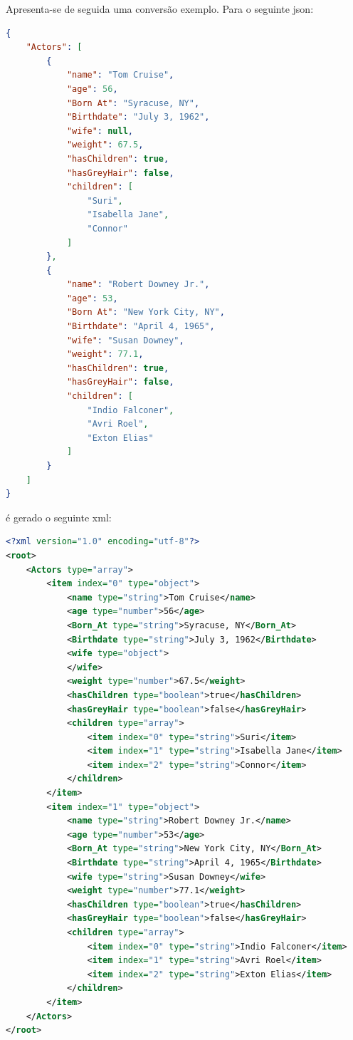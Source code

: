 Apresenta-se de seguida uma conversão exemplo. Para o seguinte \acrshort{json}:
\begin{lstlisting}[language=json, caption=\acrshort{json} exemplo a converter, label=exem:json]
{
    "Actors": [
        {
            "name": "Tom Cruise",
            "age": 56,
            "Born At": "Syracuse, NY",
            "Birthdate": "July 3, 1962",
            "wife": null,
            "weight": 67.5,
            "hasChildren": true,
            "hasGreyHair": false,
            "children": [
                "Suri",
                "Isabella Jane",
                "Connor"
            ]
        },
        {
            "name": "Robert Downey Jr.",
            "age": 53,
            "Born At": "New York City, NY",
            "Birthdate": "April 4, 1965",
            "wife": "Susan Downey",
            "weight": 77.1,
            "hasChildren": true,
            "hasGreyHair": false,
            "children": [
                "Indio Falconer",
                "Avri Roel",
                "Exton Elias"
            ]
        }
    ]
}
\end{lstlisting}

é gerado o seguinte \acrshort{xml}:
\begin{lstlisting}[language=xml, caption=\acrshort{xml} resultante da conversão do \acrshort{json} presente em~\ref{exem:json}]
<?xml version="1.0" encoding="utf-8"?>
<root>
    <Actors type="array">
        <item index="0" type="object">
            <name type="string">Tom Cruise</name>
            <age type="number">56</age>
            <Born_At type="string">Syracuse, NY</Born_At>
            <Birthdate type="string">July 3, 1962</Birthdate>
            <wife type="object">
            </wife>
            <weight type="number">67.5</weight>
            <hasChildren type="boolean">true</hasChildren>
            <hasGreyHair type="boolean">false</hasGreyHair>
            <children type="array">
                <item index="0" type="string">Suri</item>
                <item index="1" type="string">Isabella Jane</item>
                <item index="2" type="string">Connor</item>
            </children>
        </item>
        <item index="1" type="object">
            <name type="string">Robert Downey Jr.</name>
            <age type="number">53</age>
            <Born_At type="string">New York City, NY</Born_At>
            <Birthdate type="string">April 4, 1965</Birthdate>
            <wife type="string">Susan Downey</wife>
            <weight type="number">77.1</weight>
            <hasChildren type="boolean">true</hasChildren>
            <hasGreyHair type="boolean">false</hasGreyHair>
            <children type="array">
                <item index="0" type="string">Indio Falconer</item>
                <item index="1" type="string">Avri Roel</item>
                <item index="2" type="string">Exton Elias</item>
            </children>
        </item>
    </Actors>
</root>
\end{lstlisting}

